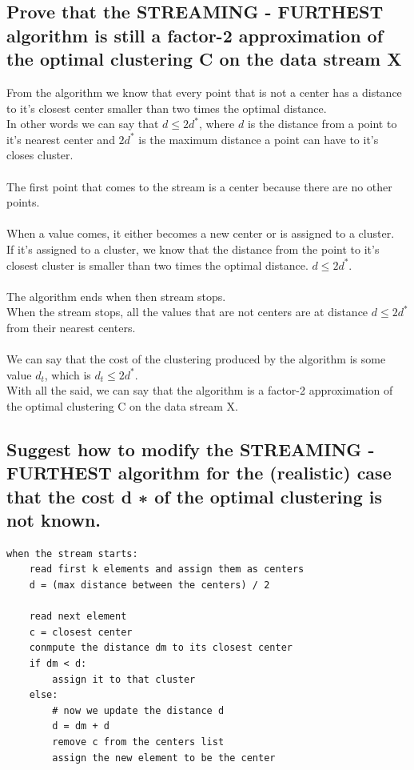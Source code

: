 \documentclass[11pt]{article}
\begin{document}
\newpage

\subsection{Prove that the STREAMING - FURTHEST algorithm is still a factor-2 approximation of the optimal clustering C on the data stream X }
From the algorithm we know that every point that is not a center has a distance to it's closest center smaller than two times the optimal distance. \\
In other words we can say that $ d \leq 2d^* $, where $ d $ is the distance from a point to it's nearest center and $ 2d^* $ is the maximum distance a point can have to it's closes cluster.
\\~\\
The first point that comes to the stream is a center because there are no other points.
\\~\\
When a value comes, it either becomes a new center or is assigned to a cluster. \\
If it's assigned to a cluster, we know that the distance from the point to it's closest cluster is smaller than two times the optimal distance.
$ d \leq 2d^* $.
\\~\\
The algorithm ends when then stream stops. \\
When the stream stops, all the values that are not centers are at distance $ d \leq 2d^* $ from their nearest centers. \\~\\

We can say that the cost of the clustering produced by the algorithm is some value $d_t$, which is $ d_t \leq 2d^* $. \\
With all the said, we can say that the algorithm is a factor-2 approximation of the optimal clustering C on the data stream X.


\subsection{Suggest how to modify the STREAMING - FURTHEST algorithm for the (realistic) case that the cost d ∗ of the optimal clustering is not known.}
 
\begin{lstlisting}
when the stream starts:
	read first k elements and assign them as centers
	d = (max distance between the centers) / 2

	read next element
	c = closest center
	conmpute the distance dm to its closest center
	if dm < d:
		assign it to that cluster
	else:
		# now we update the distance d
		d = dm + d
		remove c from the centers list
		assign the new element to be the center
\end{lstlisting} 
\end{document}
